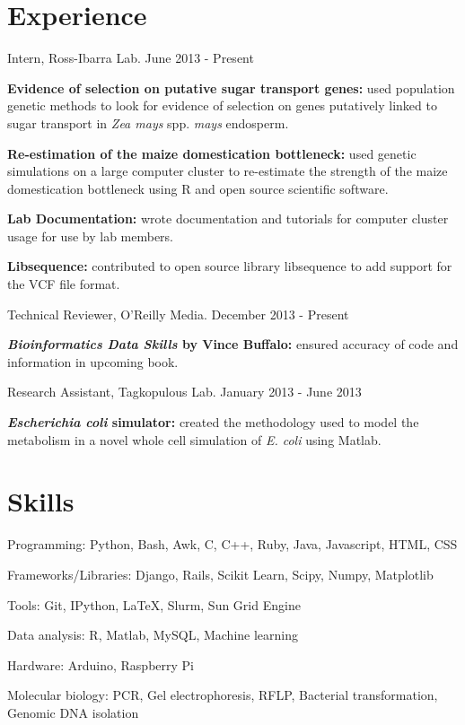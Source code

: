 \documentclass[letterpaper]{article}
\renewenvironment{itemize}{
  \begin{list}{}{
    \setlength{\leftmargin}{1.5em}
  }
}{
  \end{list}
}
\begin{document}
\section*{Experience}
\begin{itemize}
\item Intern, Ross-Ibarra Lab. \hfill June 2013 - Present
	\begin{itemize}
	\item \textbf{Evidence of selection on putative sugar transport genes:} used population genetic methods to look for evidence of selection on genes putatively linked to sugar transport in \textit{Zea mays} spp. \textit{mays} endosperm.
	\item \textbf{Re-estimation of the maize domestication bottleneck:} used genetic simulations on a large computer cluster to re-estimate the strength of the maize domestication bottleneck using R and open source scientific software.
	\item \textbf{Lab Documentation:} wrote documentation and tutorials for computer cluster usage for use by lab members. 
	\item \textbf{Libsequence:} contributed to open source library libsequence to add support for the VCF file format. 
	\end{itemize}
\item Technical Reviewer, O'Reilly Media. \hfill December 2013 - Present
	\begin{itemize}
	\item \textbf{\textit{Bioinformatics Data Skills} by Vince Buffalo:} ensured accuracy of code and information in upcoming book.
	\end{itemize}
\item Research Assistant, Tagkopulous Lab. \hfill January 2013 - June 2013
	\begin{itemize}
	\item \textbf{\textit{Escherichia coli} simulator:} created the methodology used to model the metabolism in a novel whole cell simulation of \textit{E. coli} using Matlab.
	\end{itemize}
\end{itemize}

\section*{Skills}
\begin{itemize}
\item Programming: Python, Bash, Awk, C, C++, Ruby, Java, Javascript, HTML, CSS
\item Frameworks/Libraries: Django, Rails, Scikit Learn, Scipy, Numpy, Matplotlib
\item Tools: Git, IPython, LaTeX, Slurm, Sun Grid Engine
\item Data analysis: R, Matlab, MySQL, Machine learning
\item Hardware: Arduino, Raspberry Pi
\item Molecular biology: PCR, Gel electrophoresis, RFLP, Bacterial transformation, Genomic DNA isolation
\end{itemize}
\end{document}
